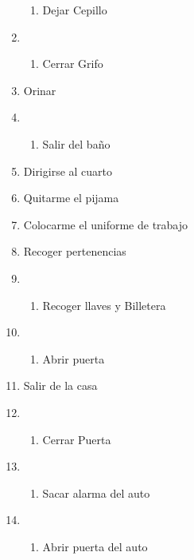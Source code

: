 \begin{enumerate}
\begin{enumerate}
  \tightlist
  \item
    Dejar Cepillo
  \end{enumerate}
\item
  \begin{enumerate}
  \def\labelenumii{\arabic{enumii}.}
  \setcounter{enumii}{1}
  \tightlist
  \item
    Cerrar Grifo
  \end{enumerate}
\item
  Orinar
\item
  \begin{enumerate}
  \def\labelenumii{\arabic{enumii}.}
  \tightlist
  \item
    Salir del baño
  \end{enumerate}
\item
  Dirigirse al cuarto
\item
  Quitarme el pijama
\item
  Colocarme el uniforme de trabajo
\item
  Recoger pertenencias
\item
  \begin{enumerate}
  \def\labelenumii{\arabic{enumii}.}
  \tightlist
  \item
    Recoger llaves y Billetera
  \end{enumerate}
\item
  \begin{enumerate}
  \def\labelenumii{\arabic{enumii}.}
  \setcounter{enumii}{1}
  \tightlist
  \item
    Abrir puerta
  \end{enumerate}
\item
  Salir de la casa
\item
  \begin{enumerate}
  \def\labelenumii{\arabic{enumii}.}
  \tightlist
  \item
    Cerrar Puerta
  \end{enumerate}
\item
  \begin{enumerate}
  \def\labelenumii{\arabic{enumii}.}
  \setcounter{enumii}{1}
  \tightlist
  \item
    Sacar alarma del auto
  \end{enumerate}
\item
  \begin{enumerate}
  \def\labelenumii{\arabic{enumii}.}
  \setcounter{enumii}{2}
  \tightlist
  \item
    Abrir puerta del auto
  \end{enumerate}

\end{enumerate}
